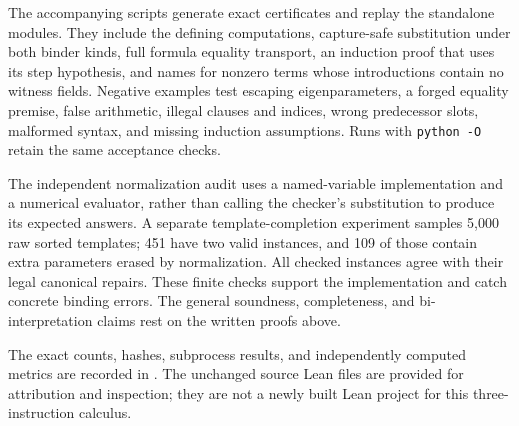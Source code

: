 The accompanying scripts generate exact certificates and replay the
standalone modules. They include the defining computations, capture-safe
substitution under both binder kinds, full formula equality transport,
an induction proof that uses its step hypothesis, and names for nonzero
terms whose introductions contain no witness fields. Negative examples
test escaping eigenparameters, a forged equality premise, false arithmetic,
illegal clauses and indices, wrong predecessor slots, malformed syntax,
and missing induction assumptions. Runs with \texttt{python -O} retain
the same acceptance checks.

The independent normalization audit uses a named-variable implementation
and a numerical evaluator, rather than calling the checker's substitution
to produce its expected answers. A separate template-completion experiment
samples 5,000 raw sorted templates; 451 have two valid instances, and 109
of those contain extra parameters erased by normalization. All checked
instances agree with their legal canonical repairs. These finite checks
support the implementation and catch concrete binding errors. The general
soundness, completeness, and bi-interpretation claims rest on the written
proofs above.

The exact counts, hashes, subprocess results, and independently computed
metrics are recorded in . The unchanged source Lean files
are provided for attribution and inspection; they are not a newly built
Lean project for this three-instruction calculus.

